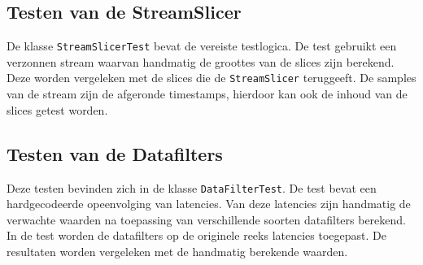 \subsection{Testen van de StreamSlicer}

De klasse \texttt{StreamSlicerTest} bevat de vereiste testlogica. De test gebruikt een verzonnen stream waarvan handmatig de groottes van de slices zijn berekend. Deze worden vergeleken met de slices die de \texttt{StreamSlicer} teruggeeft. De samples van de stream zijn de afgeronde timestamps, hierdoor kan ook de inhoud van de slices getest worden.


\subsection{Testen van de Datafilters}


Deze testen bevinden zich in de klasse \texttt{DataFilterTest}. De test bevat een hardgecodeerde opeenvolging van latencies. Van deze latencies zijn handmatig de verwachte waarden na toepassing van verschillende soorten datafilters berekend. In de test worden de datafilters op de originele reeks latencies toegepast. De resultaten worden vergeleken met de handmatig berekende waarden.